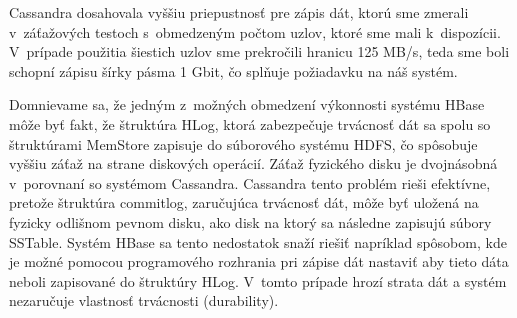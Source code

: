 \documentclass[11pt,twoside,a4paper]{book}
\begin{document}
Cassandra dosahovala vyššiu priepustnosť pre zápis dát, ktorú sme zmerali v~záťažových testoch s~obmedzeným počtom uzlov, ktoré sme mali k~dispozícii. V~prípade použitia šiestich uzlov sme prekročili hranicu 125 MB/s, teda sme boli schopní zápisu šírky pásma 1 Gbit, čo splňuje požiadavku na náš systém.

Domnievame sa, že jedným z~možných obmedzení výkonnosti systému HBase môže byť fakt, že štruktúra HLog, ktorá zabezpečuje trvácnosť dát sa spolu so štruktúrami MemStore zapisuje do súborového systému HDFS, čo spôsobuje vyššiu záťaž na strane diskových operácií. Záťaž fyzického disku je dvojnásobná v~porovnaní so systémom Cassandra. Cassandra tento problém rieši efektívne, pretože štruktúra commitlog, zaručujúca trvácnosť dát, môže byť uložená na fyzicky odlišnom pevnom disku, ako disk na ktorý sa následne zapisujú súbory SSTable. Systém HBase sa tento nedostatok snaží riešiť napríklad spôsobom, kde je možné pomocou programového rozhrania pri zápise dát nastaviť aby tieto dáta neboli zapisované do štruktúry HLog. V~tomto prípade hrozí strata dát a systém nezaručuje vlastnosť trvácnosti (durability).






% 
% 
% 


% 
% 
% 
\end{document}
